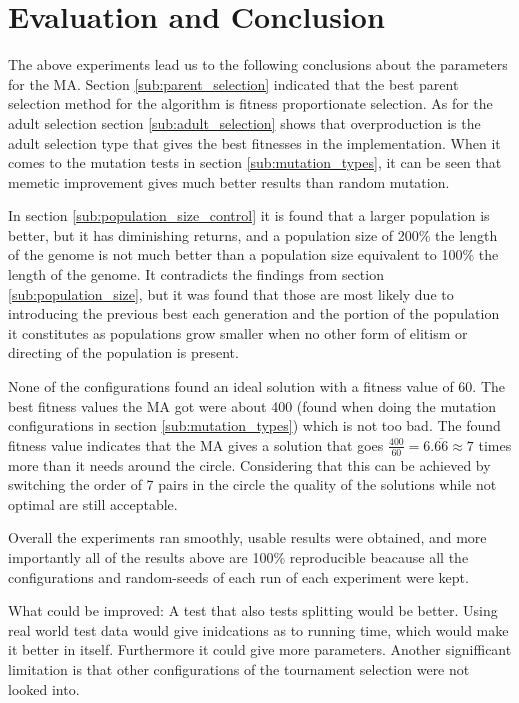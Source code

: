 \clearpage


\section{Evaluation and Conclusion} %
\label{sec:evaluation_and_conclusion}

The above experiments lead us to the following conclusions about the parameters for the MA. Section \ref{sub:parent_selection} indicated that the best parent selection method for the algorithm is fitness proportionate selection. As for the adult selection section \ref{sub:adult_selection} shows that overproduction is the adult selection type that gives the best fitnesses in the implementation. When it comes to the mutation tests in section \ref{sub:mutation_types}, it can be seen that memetic improvement gives much better results than random mutation.

In section \ref{sub:population_size_control} it is found that a larger population is better, but it has diminishing returns, and a population size of 200\% the length of the genome is not much better than a population size equivalent to 100\% the length of the genome. It contradicts the findings from section \ref{sub:population_size}, but it was found that those are most likely due to introducing the previous best each generation and the portion of the population it constitutes as populations grow smaller when no other form of elitism or directing of the population is present.

None of the configurations found an ideal solution with a fitness value of 60. The best fitness values the MA got were about 400 (found when doing the mutation configurations in section \ref{sub:mutation_types}) which is not too bad. The found fitness value indicates that the MA gives a solution that goes $\frac{400}{60} = 6.\overline{66} \approx 7$ times more than it needs around the circle. Considering that this can be achieved by switching the order of 7 pairs in the circle the quality of the solutions while not optimal are still acceptable.

Overall the experiments ran smoothly, usable results were obtained, and more importantly all of the results above are 100\% reproducible beacause all the configurations and random-seeds of each run of each experiment were kept.

What could be improved: A test that also tests splitting would be better. Using real world test data would give inidcations as to running time, which would make it better in itself. Furthermore it could give more parameters. Another signifficant limitation is that other configurations of the tournament selection were not looked into.

